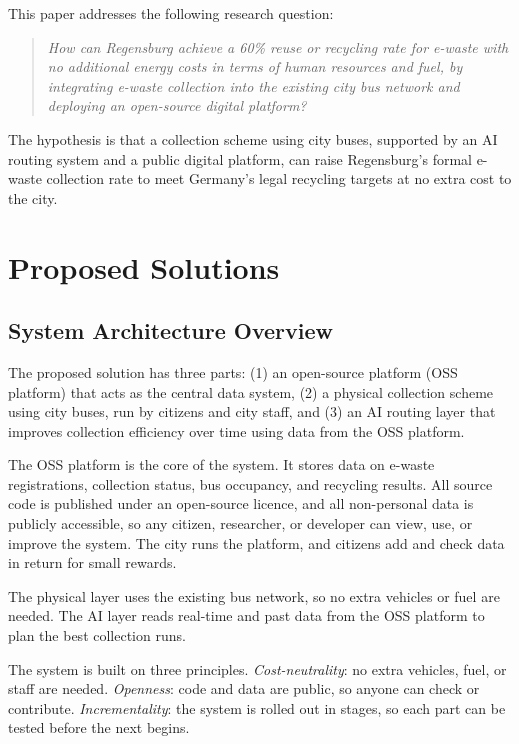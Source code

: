\documentclass[12pt, a4paper]{article}
\begin{document}
This paper addresses the following research question:

\begin{quote}
  \textit{How can Regensburg achieve a 60\% reuse or recycling rate for e-waste
  with no additional energy costs in terms of human resources and fuel, by
  integrating e-waste collection into the existing city bus network and deploying
  an open-source digital platform?}
\end{quote}

The hypothesis is that a collection scheme using city buses, supported by an
AI routing system and a public digital platform, can raise Regensburg's formal
e-waste collection rate to meet Germany's legal recycling targets at no extra
cost to the city.

\section{Proposed Solutions}

\subsection{System Architecture Overview}

The proposed solution has three parts:
(1) an open-source platform (OSS platform) that acts as the central data system,
(2) a physical collection scheme using city buses, run by citizens and city staff, and
(3) an AI routing layer that improves collection efficiency over time using data from the OSS platform.

The OSS platform is the core of the system. It stores data on e-waste registrations, collection status,
bus occupancy, and recycling results. All source code is published under an open-source licence,
and all non-personal data is publicly accessible, so any citizen, researcher, or developer
can view, use, or improve the system.
The city runs the platform, and citizens add and check data in return for small rewards.

The physical layer uses the existing bus network, so no extra vehicles or fuel are needed.
The AI layer reads real-time and past data from the OSS platform to plan the best collection runs.

The system is built on three principles.
\textit{Cost-neutrality}: no extra vehicles, fuel, or staff are needed.
\textit{Openness}: code and data are public, so anyone can check or contribute.
\textit{Incrementality}: the system is rolled out in stages, so each part can be tested before the next begins.
\end{document}
